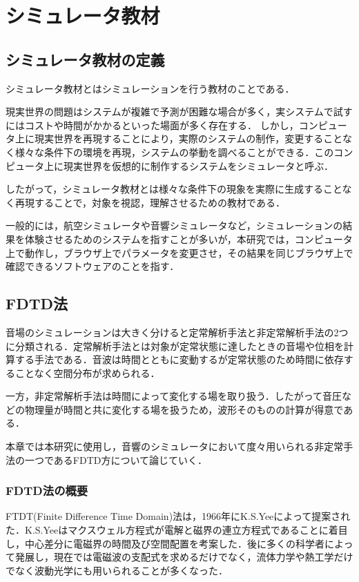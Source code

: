 \documentclass[a4j,12pt]{jsarticle}
\begin{document}
\section{シミュレータ教材}
\subsection{シミュレータ教材の定義}
シミュレータ教材とはシミュレーションを行う教材のことである．

現実世界の問題はシステムが複雑で予測が困難な場合が多く，実システムで試すにはコストや時間がかかるといった場面が多く存在する．
しかし，コンピュータ上に現実世界を再現することにより，実際のシステムの制作，変更することなく様々な条件下の環境を再現，システムの挙動を調べることができる．このコンピュータ上に現実世界を仮想的に制作するシステムをシミュレータと呼ぶ．

したがって，シミュレータ教材とは様々な条件下の現象を実際に生成することなく再現することで，対象を視認，理解させるための教材である．

一般的には，航空シミュレータや音響シミュレータなど，シミュレーションの結果を体験させるためのシステムを指すことが多いが，本研究では，コンピュータ上で動作し，ブラウザ上でパラメータを変更させ，その結果を同じブラウザ上で確認できるソフトウェアのことを指す．
\subsection{FDTD法}
音場のシミュレーションは大きく分けると定常解析手法と非定常解析手法の2つに分類される．定常解析手法とは対象が定常状態に達したときの音場や位相を計算する手法である．音波は時間とともに変動するが定常状態のため時間に依存することなく空間分布が求められる．

一方，非定常解析手法は時間によって変化する場を取り扱う．したがって音圧などの物理量が時間と共に変化する場を扱うため，波形そのものの計算が得意である．

本章では本研究に使用し，音響のシミュレータにおいて度々用いられる非定常手法の一つであるFDTD方について論じていく．

\subsubsection{FDTD法の概要}
FTDT(Finite Difference Time Domain)法は，1966年にK.S.Yeeによって提案された．K.S.Yeeはマクスウェル方程式が電解と磁界の連立方程式であることに着目し，中心差分に電磁界の時間及び空間配置を考案した．後に多くの科学者によって発展し，現在では電磁波の支配式を求めるだけでなく，流体力学や熱工学だけでなく波動光学にも用いられることが多くなった．
\end{document}
